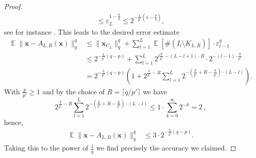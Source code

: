 \documentclass[12pt]{article}
\theoremstyle{plain}
\theoremstyle{definition}
\newcommand{\expect}{\operatorname{\mathbb{E}}}
\newcommand{\eps}{\varepsilon}
\renewcommand{\vec}{\boldsymbol}
\begin{document}
\begin{proof}
\begin{align}
            \leq \eps_L^{1-\frac{p}{q}}
            \leq 2^{-\frac{L}{p'}\left(1 - \frac{p}{q}\right)} , \label{eq:Interpolation}
    \end{align}
    see for instance \cite[Lem~2.4]{KNR19}.
    This leads to the desired error estimate
    \begin{align*}
        \expect \|\vec{x} - A_{L,R}(\vec{x})\|_q^q
            &\leq \|\vec{x}_{C_L}\|_q^q
                + \sum_{l=1}^L \expect\left[\#(I_l \setminus K_{L,R})\right] \cdot \eps_{l-1}^q \\
            &\leq 2^{-\frac{L}{p'}\left(q - p\right)}
                    + \sum_{l=1}^L 2^{ l \frac{p}{p'} - (L - l + 1) \cdot R} \cdot 2^{-(l-1) \cdot \frac{q}{p'}} \\
            &= 2^{-\frac{L}{p'}\left(q - p\right)}
                    \left(1 
                    + 2^{\frac{q}{p'} - R} \sum_{l=1}^L 2^{-\left(\frac{p}{p'} + R - \frac{q}{p'}\right) \cdot (L-l)}
                    \right).
    \end{align*}
    With $\frac{p}{p'} \geq 1$ and by the choice of $R = \lceil q/p' \rceil$ we have
    \begin{equation*}
        2^{\frac{q}{p'} - R} \sum_{l=1}^L 2^{-\left(\frac{p}{p'}+R - \frac{q}{p'}\right) \cdot (L-l)}
            \leq 1 \cdot \sum_{k=0}^\infty 2^{-k}
            = 2 \,,
    \end{equation*}
    hence,
    \begin{align*}
        \expect \|\vec{x} - A_{L,R}(\vec{x})\|_q^q
            & \leq 3 \cdot 2^{-\frac{L}{p'}\left(q - p\right)} .
    \end{align*}
    Taking this to the power of $\frac{1}{q}$ we find precisely the accuracy we claimed.


\end{proof}
\end{document}
